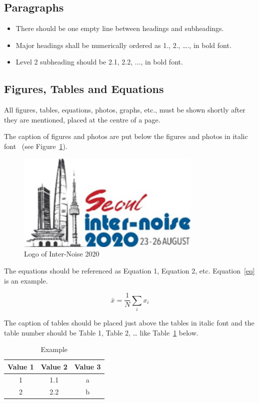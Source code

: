\documentclass[a4paper,12pt]{article}
\renewcommand\eqref[1]{Equation~\ref{#1}}
\begin{document}
\subsection{Paragraphs}

\begin{itemize}
	\item There should be one empty line between headings and subheadings.
	\item Major headings shall be numerically ordered as 1., 2., …., in bold font.
	\item Level 2 subheading should be 2.1, 2.2, ..., in bold font.
\end{itemize}

\subsection{Figures, Tables and Equations}
All figures, tables, equations, photos, graphs, etc., must be shown shortly after they are mentioned, placed at the centre of a page. \par 
The caption of figures and photos are put below the figures and photos in italic font ~\cite{andre18}(see Figure~\ref{fig:logo}).

\begin{figure}[!h]
	\centering
	\includegraphics[width=88mm]{logo2020.png}
	\caption{Logo of Inter-Noise 2020}
	\label{fig:logo}
\end{figure}

The equations should be referenced as Equation 1, Equation 2, etc.
\eqref{eq} is an example.  

\begin{equation}
	\bar x= \frac{1}{N}\sum_ix_i
	\label{eq}
\end{equation}

The caption of tables should be placed just above the tables in italic font and the table number should be Table 1, Table 2, … like Table~\ref{tab:table1} below.

\begin{table}[h!]
  \begin{center}
    \caption{Example}  
    \label{tab:table1}
    \begin{tabular}{c c c} 
     \hline	
      \textbf{Value 1} & \textbf{Value 2} & \textbf{Value 3}\\
      \hline
      1 & 1.1 & a\\
      \hline	
      2 & 2.2 & b\\
      \hline	
    \end{tabular}
  \end{center}

\end{table}
\end{document}
